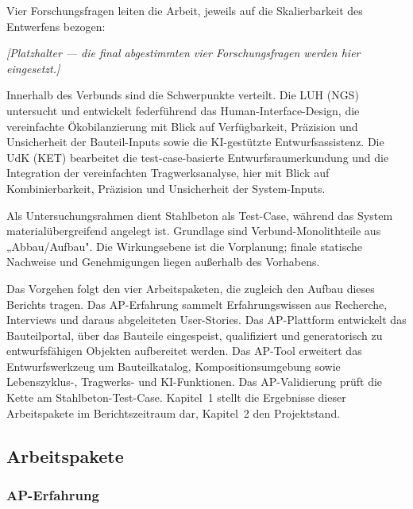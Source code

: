 \documentclass[type=zwischenbericht]{zukunftbau}
\begin{document}
Vier Forschungsfragen leiten die Arbeit, jeweils auf die Skalierbarkeit des Entwerfens bezogen:

\begin{Blockquote}
\textit{[Platzhalter --- die final abgestimmten vier Forschungsfragen werden hier eingesetzt.]}
\end{Blockquote}

Innerhalb des Verbunds sind die Schwerpunkte verteilt. Die LUH (NGS) untersucht und entwickelt federführend das Human-Interface-Design, die vereinfachte Ökobilanzierung mit Blick auf Verfügbarkeit, Präzision und Unsicherheit der Bauteil-Inputs sowie die KI-gestützte Entwurfsassistenz. Die UdK (KET) bearbeitet die test-case-basierte Entwurfsraumerkundung und die Integration der vereinfachten Tragwerksanalyse, hier mit Blick auf Kombinierbarkeit, Präzision und Unsicherheit der System-Inputs.

Als Untersuchungsrahmen dient Stahlbeton als Test-Case, während das System materialübergreifend angelegt ist. Grundlage sind Verbund-Monolithteile aus „Abbau/Aufbau". Die Wirkungsebene ist die Vorplanung; finale statische Nachweise und Genehmigungen liegen außerhalb des Vorhabens.

Das Vorgehen folgt den vier Arbeitspaketen, die zugleich den Aufbau dieses Berichts tragen. Das AP-Erfahrung sammelt Erfahrungswissen aus Recherche, Interviews und daraus abgeleiteten User-Stories. Das AP-Plattform entwickelt das Bauteilportal, über das Bauteile eingespeist, qualifiziert und generatorisch zu entwurfsfähigen Objekten aufbereitet werden. Das AP-Tool erweitert das Entwurfswerkzeug um Bauteilkatalog, Kompositionsumgebung sowie Lebenszyklus-, Tragwerks- und KI-Funktionen. Das AP-Validierung prüft die Kette am Stahlbeton-Test-Case. Kapitel~1 stellt die Ergebnisse dieser Arbeitspakete im Berichtszeitraum dar, Kapitel~2 den Projektstand.

\subsection{Arbeitspakete}

\subsubsection{AP-Erfahrung}
\end{document}
